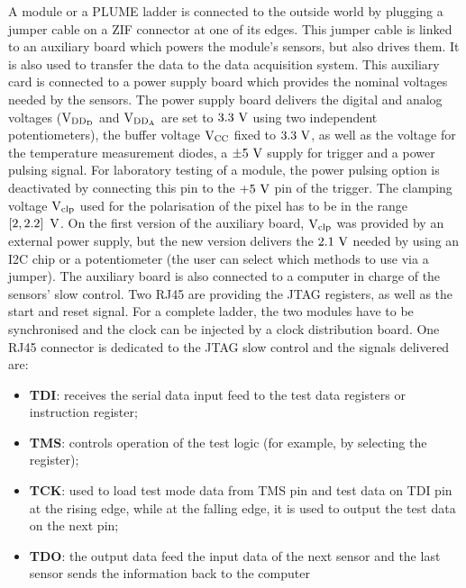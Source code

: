   A module or a PLUME ladder is connected to the outside world by plugging a jumper cable on a \gls{ZIF} connector at one of its edges.
  This jumper cable is linked to an auxiliary board which powers the module's sensors, but also drives them.
  It is also used to transfer the data to the data acquisition system.
  This auxiliary card is connected to a power supply board which provides the nominal voltages needed by the sensors.
  The power supply board delivers the digital and analog voltages ($\rm{V}_{\rm{DD_D}}$ and $\rm{V}_{\rm{DD_A}}$ are set to $3.3~\rm{V}$ using two independent potentiometers), the buffer voltage $\rm{V}_{\rm{CC}}$ fixed to $3.3~\rm{V}$, as well as the voltage for the temperature measurement diodes, a $\pm 5~\rm{V}$ supply for trigger and a power pulsing signal.
  For laboratory testing of a module, the power pulsing option is deactivated by connecting this pin to the $+5~\rm{V}$ pin of the trigger.
  The clamping voltage $\rm{V}_{\rm{clp}}$ used for the polarisation of the pixel has to be in the range $\left[2, 2.2\right]~\rm{V}$.
  On the first version of the auxiliary board, $\rm{V}_{\rm{clp}}$ was provided by an external power supply, but the new version delivers the $2.1~\rm{V}$ needed by using an \gls{I2C} chip or a potentiometer (the user can select which methods to use via a jumper).
  The auxiliary board is also connected to a computer in charge of the sensors' slow control.
  Two RJ45 are providing the \gls{JTAG} registers, as well as the start and reset signal. 
  For a complete ladder, the two modules have to be synchronised and the clock can be injected by a clock distribution board.
  One RJ45 connector is dedicated to the \gls{JTAG} slow control and the signals delivered are: 

  \begin{itemize}
    \item \textbf{\gls{TDI}}: receives the serial data input feed to the test data registers or instruction register;
    \item \textbf{\gls{TMS}}: controls operation of the test logic (for example, by selecting the register);
    \item \textbf{\gls{TCK}}: used to load test mode data from \gls{TMS} pin and test data on \gls{TDI} pin at the rising edge, while at the falling edge, it is used to output the test data on the next pin;
    \item \textbf{\gls{TDO}}: the output data feed the input data of the next sensor and the last sensor sends the information back to the computer 
  \end{itemize}

